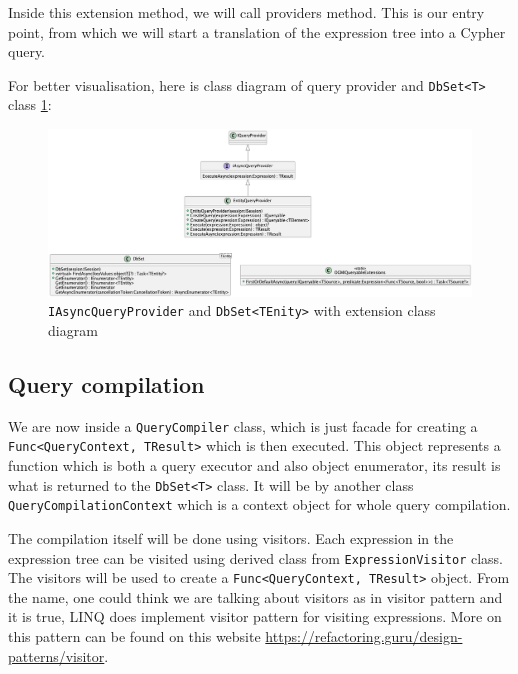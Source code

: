 Inside this extension method, we will call providers\linebreak
{} method. This is our entry point, from which we will start a translation
of the expression tree into a Cypher query.

For better visualisation, here is class diagram of query provider and \texttt{DbSet<T>} class \ref{fig:queryprovider}:

\begin{figure}[H]
    \centering
    \includegraphics[width=\textwidth]{content/QueryProvider.png}
    \caption{\texttt{IAsyncQueryProvider} and \texttt{DbSet<TEnity>} with extension class diagram}
    \label{fig:queryprovider}
\end{figure}

\subsection{Query compilation}

We are now inside a \texttt{QueryCompiler} class, which is just facade for creating a \texttt{Func<QueryContext, TResult>} which is then executed.
This object represents a function which is both a query executor and also object enumerator, its result is what is returned to the \texttt{DbSet<T>} class.
It will be by another class \texttt{QueryCompilationContext} which is a context object for whole query compilation.

The compilation itself will be done using visitors. Each expression in the expression tree can be visited using derived class from \texttt{ExpressionVisitor} class.
The visitors will be used to create a \texttt{Func<QueryContext, TResult>} object. From the name, one could think we are talking about visitors as in visitor pattern and
it is true, LINQ does implement visitor pattern for visiting expressions. More on this pattern can be found on this website \url{https://refactoring.guru/design-patterns/visitor}.

